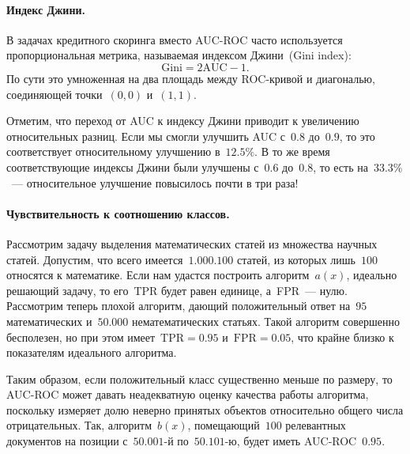 \documentclass[12pt,fleqn]{article}
\begin{document}
\paragraph{Индекс Джини.}
В задачах кредитного скоринга вместо AUC-ROC часто используется пропорциональная
метрика, называемая индексом Джини~(Gini index):
\[
    \text{Gini}
    =
    2 \text{AUC} - 1.
\]
По сути это умноженная на два площадь между ROC-кривой и диагональю, соединяющей точки~$(0, 0)$ и~$(1, 1)$.

Отметим, что переход от AUC к индексу Джини приводит к увеличению относительных разниц.
Если мы смогли улучшить AUC с~$0.8$ до~$0.9$, то это соответствует
относительному улучшению в~$12.5\%$.
В то же время соответствующие индексы Джини были улучшены с~$0.6$ до~$0.8$,
то есть на~$33.3\%$~--- относительное улучшение повысилось почти в три раза!

\paragraph{Чувствительность к соотношению классов.}
Рассмотрим задачу выделения математических статей из множества научных статей.
Допустим, что всего имеется~$1.000.100$ статей, из которых лишь~$100$ относятся к математике.
Если нам удастся построить алгоритм~$a(x)$, идеально решающий задачу,
то его~TPR будет равен единице, а~FPR~--- нулю.
Рассмотрим теперь плохой алгоритм, дающий положительный ответ на~$95$ математических
и~$50.000$ нематематических статьях.
Такой алгоритм совершенно бесполезен, но при этом имеет~$\text{TPR} = 0.95$
и~$\text{FPR} = 0.05$, что крайне близко к показателям идеального алгоритма.

Таким образом, если положительный класс существенно меньше по размеру,
то AUC-ROC может давать неадекватную оценку качества работы алгоритма,
поскольку измеряет долю неверно принятых объектов относительно
общего числа отрицательных.
Так, алгоритм~$b(x)$, помещающий~$100$ релевантных документов
на позиции с~$50.001$-й по~$50.101$-ю, будет иметь AUC-ROC~$0.95$.
\end{document}
